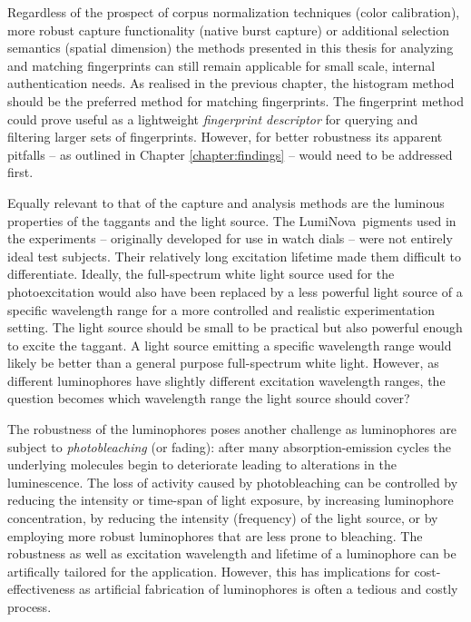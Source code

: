 \documentclass[thesis.tex]{subfiles}
\begin{document}
Regardless of the prospect of corpus normalization techniques (color calibration), more robust capture functionality (native burst capture) or additional selection semantics (spatial dimension) the methods presented in this thesis for analyzing and matching fingerprints can still remain applicable for small scale, internal authentication needs. As realised in the previous chapter, the histogram method should be the preferred method for matching fingerprints. The fingerprint method could prove useful as a lightweight \emph{fingerprint descriptor} for querying and filtering larger sets of fingerprints. However, for better robustness its apparent pitfalls -- as outlined in Chapter \ref{chapter:findings} -- would need to be addressed first.

Equally relevant to that of the capture and analysis methods are the luminous properties of the taggants and the light source. The LumiNova\textregistered\ pigments used in the experiments -- originally developed for use in watch dials -- were not entirely ideal test subjects. Their relatively long excitation lifetime made them difficult to differentiate. Ideally, the full-spectrum white light source used for the photoexcitation would also have been replaced by a less powerful light source of a specific wavelength range for a more controlled and realistic experimentation setting. The light source should be small to be practical but also powerful enough to excite the taggant. A light source emitting a specific wavelength range would likely be better than a general purpose full-spectrum white light. However, as different luminophores have slightly different excitation wavelength ranges, the question becomes which wavelength range the light source should cover?

The robustness of the luminophores poses another challenge as luminophores are subject to \emph{photobleaching} (or fading): after many absorption-emission cycles the underlying molecules begin to deteriorate leading to alterations in the luminescence. The loss of activity caused by photobleaching can be controlled by reducing the intensity or time-span of light exposure, by increasing luminophore concentration, by reducing the intensity (frequency) of the light source, or by employing more robust luminophores that are less prone to bleaching. The robustness as well as excitation wavelength and lifetime of a luminophore can be artifically tailored for the application. However, this has implications for cost-effectiveness as artificial fabrication of luminophores is often a tedious and costly process.
\end{document}
